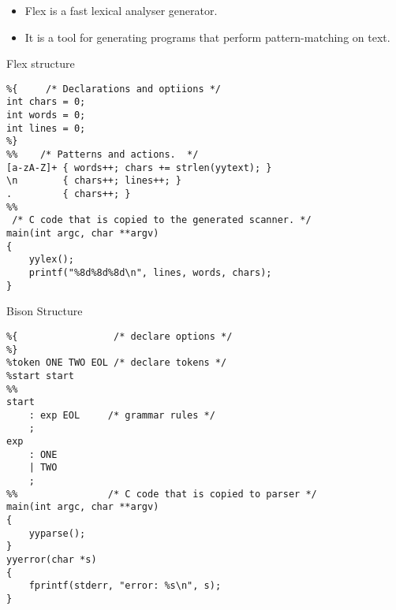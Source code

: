 \documentclass[compress]{beamer}
\begin{document}
\note
{
    \begin{itemize}
        \item Flex is a fast lexical analyser generator. 
        \item It is a tool for generating programs that perform pattern-matching on text.
        \end{itemize}
}


\begin{frame}[containsverbatim]{Flex structure}
\scriptsize{\begin{verbatim}
%{     /* Declarations and optiions */
int chars = 0;
int words = 0;
int lines = 0;
%}
%%    /* Patterns and actions.  */
[a-zA-Z]+ { words++; chars += strlen(yytext); }
\n        { chars++; lines++; }
.         { chars++; }
%%
 /* C code that is copied to the generated scanner. */
main(int argc, char **argv)
{
    yylex();
    printf("%8d%8d%8d\n", lines, words, chars);
}
\end{verbatim}}
\end{frame} 


\begin{frame}[containsverbatim]{Bison Structure}
\scriptsize{\begin{verbatim}
%{                 /* declare options */
%}                  
%token ONE TWO EOL /* declare tokens */
%start start
%%               
start
    : exp EOL     /* grammar rules */
    ;
exp
    : ONE 
    | TWO
    ;
%%                /* C code that is copied to parser */
main(int argc, char **argv)
{
    yyparse();
}
yyerror(char *s)
{
    fprintf(stderr, "error: %s\n", s);
}
\end{verbatim}}

\end{frame}
\end{document}
